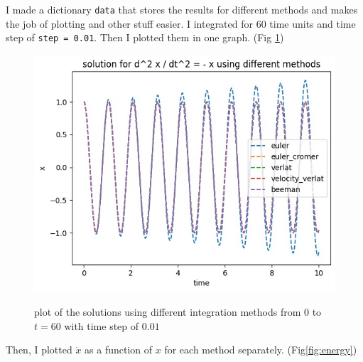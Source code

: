 \documentclass[12pt, a4paper]{article}
\begin{document}
	I made a dictionary \texttt{data} that stores the results for different methods and makes the job of plotting and other stuff easier.
	I integrated for 60 time units and time step of \texttt{step = 0.01}. Then I plotted them in one graph. (Fig \ref{fig:ODEs})
	\begin{figure}[h!]
		\centering
		\includegraphics[width=0.8\linewidth]{../p2/ode2_plots.jpg}
		\label{fig:ODEs}
		\caption{plot of the solutions using different integration methods from $0$ to $t = 60$ with time step of $0.01$}
	\end{figure}
	Then, I plotted $\dot{x}$ as a function of $x$ for each method separately. (Fig\ref{fig:energy})
\end{document}
